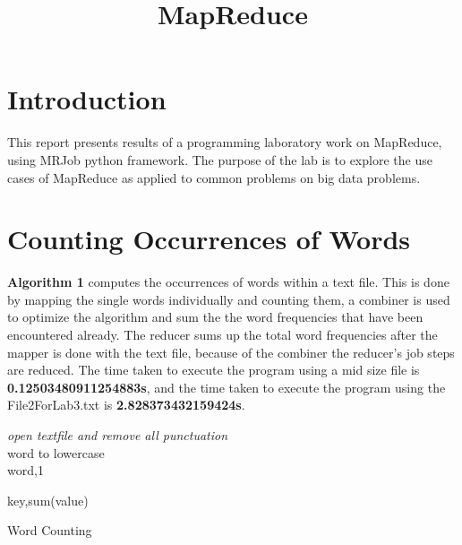 \documentclass[11pt]{IEEEtran}
\begin{document}
	\title{MapReduce}
	\author{}
	\maketitle
	

\section{Introduction}

\noindent
This report presents results of a programming laboratory work on MapReduce, using MRJob python framework. The purpose of the lab is to explore the use cases of MapReduce as applied to common problems on big data problems.


\section{Counting Occurrences of Words}

\noindent
\textbf{Algorithm 1} computes the occurrences of words within a text file. This is done by mapping the single words individually and counting them, a combiner is used to optimize the algorithm and sum the the word frequencies that have been encountered already. The reducer sums up the total word frequencies after the mapper is done with the text file, because of the combiner the reducer's job steps are reduced. The time taken to execute the program using a mid size file is  \textbf{0.12503480911254883s}, and the time taken to execute the program using the File2ForLab3.txt is \textbf{2.828373432159424s}.


\begin{algorithm}[H]
 
 \emph{open textfile and remove all punctuation} \\
 {
   {
    word to lowercase\\
    \Return word,1
   }
 }
 {
   {

    \Return key,sum(value)
   }
 }
 
 \caption{Word Counting}
\end{algorithm}
\end{document}
